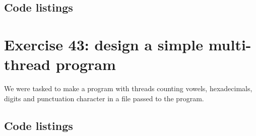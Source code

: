 \documentclass[11pt]{article}
\begin{document}
\subsection*{Code listings}




\section*{Exercise 43: design a simple multi-thread program}
We were tasked to make a program with threads counting vowels, hexadecimals, digits and punctuation character in a file passed to the program.

\subsection*{Code listings}









\end{document}
